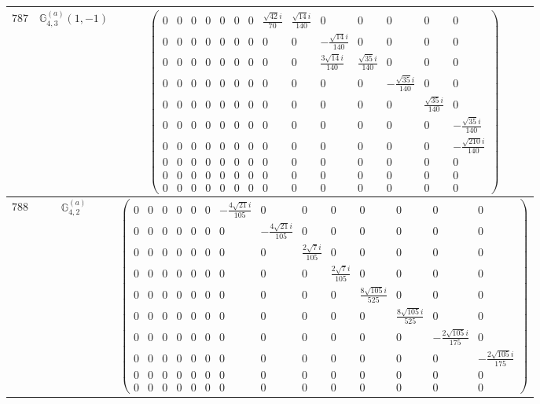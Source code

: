 \documentclass[fleqn,8pt,landscape]{jsarticle}
\begin{document}
\begin{center}
\begin{longtable}{ccc}
$ 787 $ & $ \mathbb{G}_{4,3}^{(a)}(1,-1) $ & $ \begin{pmatrix} 0 & 0 & 0 & 0 & 0 & 0 & 0 & \frac{\sqrt{42} i}{70} & \frac{\sqrt{14} i}{140} & 0 & 0 & 0 & 0 & 0 \\ 0 & 0 & 0 & 0 & 0 & 0 & 0 & 0 & 0 & - \frac{\sqrt{14} i}{140} & 0 & 0 & 0 & 0 \\ 0 & 0 & 0 & 0 & 0 & 0 & 0 & 0 & 0 & \frac{3 \sqrt{14} i}{140} & \frac{\sqrt{35} i}{140} & 0 & 0 & 0 \\ 0 & 0 & 0 & 0 & 0 & 0 & 0 & 0 & 0 & 0 & 0 & - \frac{\sqrt{35} i}{140} & 0 & 0 \\ 0 & 0 & 0 & 0 & 0 & 0 & 0 & 0 & 0 & 0 & 0 & 0 & \frac{\sqrt{35} i}{140} & 0 \\ 0 & 0 & 0 & 0 & 0 & 0 & 0 & 0 & 0 & 0 & 0 & 0 & 0 & - \frac{\sqrt{35} i}{140} \\ 0 & 0 & 0 & 0 & 0 & 0 & 0 & 0 & 0 & 0 & 0 & 0 & 0 & - \frac{\sqrt{210} i}{140} \\ 0 & 0 & 0 & 0 & 0 & 0 & 0 & 0 & 0 & 0 & 0 & 0 & 0 & 0 \\ 0 & 0 & 0 & 0 & 0 & 0 & 0 & 0 & 0 & 0 & 0 & 0 & 0 & 0 \\ 0 & 0 & 0 & 0 & 0 & 0 & 0 & 0 & 0 & 0 & 0 & 0 & 0 & 0 \end{pmatrix} $ \\ \hline
$ 788 $ & $ \mathbb{G}_{4,2}^{(a)} $ & $ \begin{pmatrix} 0 & 0 & 0 & 0 & 0 & 0 & - \frac{4 \sqrt{21} i}{105} & 0 & 0 & 0 & 0 & 0 & 0 & 0 \\ 0 & 0 & 0 & 0 & 0 & 0 & 0 & - \frac{4 \sqrt{21} i}{105} & 0 & 0 & 0 & 0 & 0 & 0 \\ 0 & 0 & 0 & 0 & 0 & 0 & 0 & 0 & \frac{2 \sqrt{7} i}{105} & 0 & 0 & 0 & 0 & 0 \\ 0 & 0 & 0 & 0 & 0 & 0 & 0 & 0 & 0 & \frac{2 \sqrt{7} i}{105} & 0 & 0 & 0 & 0 \\ 0 & 0 & 0 & 0 & 0 & 0 & 0 & 0 & 0 & 0 & \frac{8 \sqrt{105} i}{525} & 0 & 0 & 0 \\ 0 & 0 & 0 & 0 & 0 & 0 & 0 & 0 & 0 & 0 & 0 & \frac{8 \sqrt{105} i}{525} & 0 & 0 \\ 0 & 0 & 0 & 0 & 0 & 0 & 0 & 0 & 0 & 0 & 0 & 0 & - \frac{2 \sqrt{105} i}{175} & 0 \\ 0 & 0 & 0 & 0 & 0 & 0 & 0 & 0 & 0 & 0 & 0 & 0 & 0 & - \frac{2 \sqrt{105} i}{175} \\ 0 & 0 & 0 & 0 & 0 & 0 & 0 & 0 & 0 & 0 & 0 & 0 & 0 & 0 \\ 0 & 0 & 0 & 0 & 0 & 0 & 0 & 0 & 0 & 0 & 0 & 0 & 0 & 0 \end{pmatrix} $ \\ \hline

\end{longtable}
\end{center}
\end{document}
